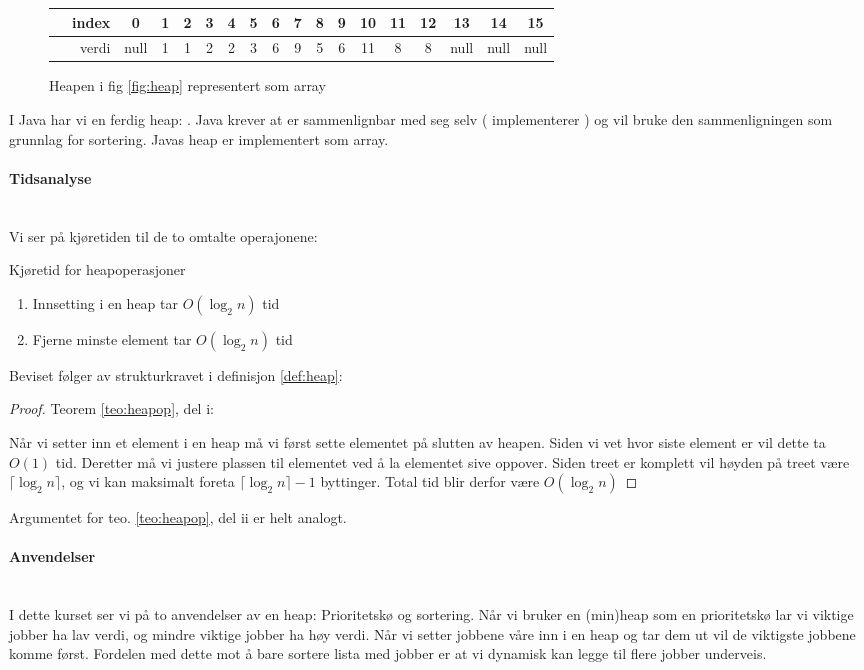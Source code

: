 \begin{figure}[H]
\centering
\caption{Heapen i fig \ref{fig:heap} representert som array}
\begin{tabular}{r||c|c|c|c|c|c|c|c|c|c|c|c|c|c|c|c}
	~~index &  0   & 1 & 2 & 3 & 4 & 5 & 6 & 7 & 8 & 9 & 10 & 11 & 12 &  13  &  14  &  15  \\ \hline
	~~verdi & null & 1 & 1 & 2 & 2 & 3 & 6 & 9 & 5 & 6 & 11 & 8  & 8  & null & null & null 
\end{tabular}
\end{figure}

I Java har vi en ferdig heap: . Java krever at  er sammenlignbar med seg selv ( implementerer ) og vil bruke den sammenligningen som grunnlag for sortering. Javas heap er implementert som array. 

\paragraph{Tidsanalyse}~\\
Vi ser på kjøretiden til de to omtalte operajonene:
\begin{theorem} Kjøretid for heapoperasjoner \label{teo:heapop}
\begin{enumerate}[i]
\item Innsetting i en heap tar $ O(\log_2 n) $ tid
\item Fjerne minste element tar $ O(\log_2 n) $ tid
\end{enumerate}
\end{theorem}
Beviset følger av strukturkravet i definisjon \ref{def:heap}:
\begin{proof} Teorem \ref{teo:heapop}, del i:

Når vi setter inn et element i en heap må vi først sette elementet på slutten av heapen. Siden vi vet hvor siste element er vil dette ta $ O(1) $ tid. Deretter må vi justere plassen til elementet ved å la elementet sive oppover. Siden treet er komplett vil høyden på treet være $ \lceil\log_2 n\rceil $, og vi kan maksimalt foreta $ \lceil\log_2 n\rceil - 1 $ byttinger. Total tid blir derfor være $ O(\log_2 n) $
\end{proof}
Argumentet for teo. \ref{teo:heapop}, del ii er helt analogt. 


\paragraph{Anvendelser}~\\
I dette kurset ser vi på to anvendelser av en heap: Prioritetskø og sortering. Når vi bruker en (min)heap som en prioritetskø lar vi viktige jobber ha lav verdi, og mindre viktige jobber ha høy verdi. Når vi setter jobbene våre inn i en heap og tar dem ut vil de viktigste jobbene komme først. Fordelen med dette mot å bare sortere lista med jobber er at vi dynamisk kan legge til flere jobber underveis. 

